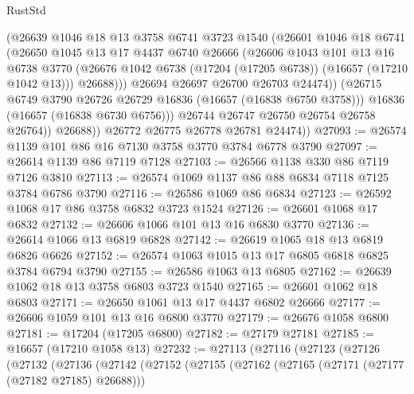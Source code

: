\begin{lexlean}{RustStd}
\begin{coremodule}
                    (@26639
                      @1046
                      @18
                      @13
                      @3758
                      @6741
                      @3723
                      @1540
                      (@26601
                        @1046
                        @18
                        @6741
                        (@26650
                          @1045
                          @13
                          @17
                          @4437
                          @6740
                          @26666
                          (@26606
                            @1043
                            @101
                            @13
                            @16
                            @6738
                            @3770
                            (@26676 @1042 @6738 (@17204 (@17205 @6738)) (@16657 (@17210 @1042 @13)))
                            @26688)))
                      @26694
                      @26697
                      @26700
                      @26703
                      @24474))
                  (@26715 @6749 @3790 @26726 @26729 @16836 (@16657 (@16838 @6750 @3758)))
                  @16836
                  (@16657 (@16838 @6730 @6756)))
                @26744
                @26747
                @26750
                @26754
                @26758
                @26764))
            @26688))
        @26772
        @26775
        @26778
        @26781
        @24474))
@27093 := @26574 @1139 @101 @86 @16 @7130 @3758 @3770 @3784 @6778 @3790
@27097 := @26614 @1139 @86 @7119 @7128
@27103 := @26566 @1138 @330 @86 @7119 @7126 @3810
@27113 := @26574 @1069 @1137 @86 @88 @6834 @7118 @7125 @3784 @6786 @3790
@27116 := @26586 @1069 @86 @6834
@27123 := @26592 @1068 @17 @86 @3758 @6832 @3723 @1524
@27126 := @26601 @1068 @17 @6832
@27132 := @26606 @1066 @101 @13 @16 @6830 @3770
@27136 := @26614 @1066 @13 @6819 @6828
@27142 := @26619 @1065 @18 @13 @6819 @6826 @6626
@27152 := @26574 @1063 @1015 @13 @17 @6805 @6818 @6825 @3784 @6794 @3790
@27155 := @26586 @1063 @13 @6805
@27162 := @26639 @1062 @18 @13 @3758 @6803 @3723 @1540
@27165 := @26601 @1062 @18 @6803
@27171 := @26650 @1061 @13 @17 @4437 @6802 @26666
@27177 := @26606 @1059 @101 @13 @16 @6800 @3770
@27179 := @26676 @1058 @6800
@27181 := @17204 (@17205 @6800)
@27182 := @27179 @27181
@27185 := @16657 (@17210 @1058 @13)
@27232 := @27113
    (@27116
      (@27123
        (@27126
          (@27132
            (@27136
              (@27142
                (@27152
                  (@27155
                    (@27162
                      (@27165 (@27171 (@27177 (@27182 @27185) @26688)))

\end{coremodule}
\end{lexlean}
